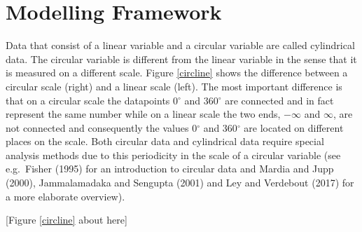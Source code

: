 \documentclass[man,mask]{apa6}
\begin{document}
\section{Modelling Framework}

Data that consist of a linear variable and a circular variable are called
cylindrical data. The circular variable is different from the linear variable in
the sense that it is measured on a different scale. Figure \ref{circline} shows
the difference between a circular scale (right) and a linear scale (left). The
most important difference is that on a circular scale the datapoints 0\(^\circ\)
and 360\(^\circ\) are connected and in fact represent the same number while on a
linear scale the two ends, \(-\infty\) and \(\infty\), are not connected and
consequently the values 0\(^\circ\) and 360\(^\circ\) are located on different
places on the scale. Both circular data and cylindrical data require special
analysis methods due to this periodicity in the scale of a circular variable
(see e.g.~Fisher (1995) for an introduction to circular data and
Mardia and Jupp (2000), Jammalamadaka and Sengupta (2001) and Ley and Verdebout (2017) for a more
elaborate overview).

\hfil \hspace{2cm} {[}Figure \ref{circline} about here{]} \hfil
\end{document}
